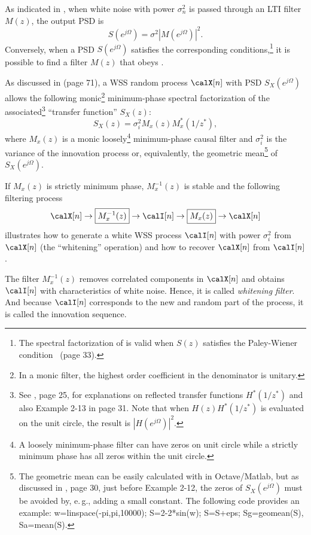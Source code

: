 As indicated in , when white noise with power $\sigma_n^2$ is passed through an LTI filter $M(z)$, the output PSD is
\begin{equation}
S(e^{j \Omega}) = \sigma^2 |M(e^{j \Omega})|^2.
\label{eq:ltiOutputPSD}
\end{equation}
Conversely, when a PSD $S(e^{j \Omega})$ satisfies the corresponding conditions,\footnote{The spectral factorization of  is valid when $S(z)$ satisfies the Paley-Wiener condition~\cite{Barry04} (page 33).} it is possible to find a filter $M(z)$ that obeys .

As discussed in \cite{Barry04} (page 71), a WSS random process $\calX[n]$ with PSD $S_X(e^{j \Omega})$  allows the following monic\footnote{In a monic filter, the highest order coefficient in the denominator is unitary.} minimum-phase spectral factorization of the associated\footnote{See \cite{Barry04}, page 25, for explanations on reflected transfer functions $H^*(1/z^*)$ and also Example 2-13 in page 31. Note that when $H(z) H^*(1/z^*)$ is evaluated on the unit circle, the result is $|H(e^{j\Omega})|^2$.} ``transfer function'' $S_X(z)$:
\begin{equation}
S_X(z) = \sigma_i^2 M_x(z) M_x^*(1/z^*),
\label{eq:spectralFactorization}
\end{equation}
where $M_x(z)$ is a monic loosely\footnote{A loosely minimum-phase filter can have zeros on unit circle while a strictly minimum phase has all zeros within the unit circle.} minimum-phase causal filter and $\sigma_i^2$ is the variance of the innovation process or, equivalently, the geometric mean\footnote{The geometric mean can be easily calculated with  in Octave/Matlab, but as discussed in \cite{Barry04}, page 30, just before Example 2-12, the zeros of $S_X(e^{j \Omega})$ must be avoided by, e.\,g., adding a small constant. The following code provides an example: w=linspace(-pi,pi,10000);
S=2-2*sin(w);
S=S+eps;
Sg=geomean(S),
Sa=mean(S).} of $S_X(e^{j \Omega})$.

If $M_x(z)$ is strictly minimum phase, $M_x^{-1}(z)$ is stable and the following filtering process
\[
\calX[n] \rightarrow\boxed{M_x^{-1}(z)}\rightarrow \calI[n] \rightarrow\boxed{M_x(z)}\rightarrow \calX[n] 
\]
illustrates how to generate a white WSS process $\calI[n]$ with power $\sigma_i^2$ from $\calX[n]$ (the ``whitening'' operation) and how to recover $\calX[n]$ from $\calI[n]$.

The filter $M_x^{-1}(z)$ removes correlated components in $\calX[n]$ and obtains $\calI[n]$ with characteristics of white noise. Hence, it is called \emph{whitening filter}. And because $\calI[n]$ corresponds to the new and random part of the process, it is called 
the innovation sequence.

